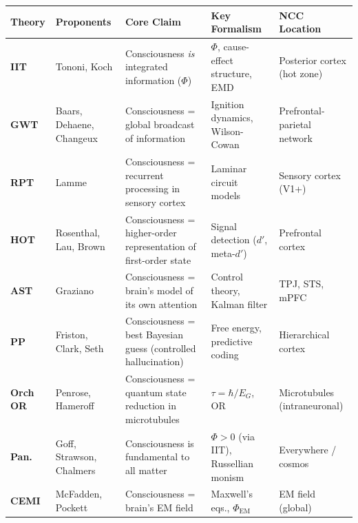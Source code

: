 \documentclass[11pt,a4paper]{report}
\begin{document}
\begin{center}
\renewcommand{\arraystretch}{1.45}
\small
\begin{tabular}{>{\raggedright}p{1.6cm} >{\raggedright}p{2.4cm} >{\raggedright}p{4.2cm} >{\raggedright}p{2.3cm} >{\raggedright\arraybackslash}p{3cm}}
  \toprule
  \textbf{Theory} & \textbf{Proponents} & \textbf{Core Claim} & \textbf{Key Formalism} & \textbf{NCC Location} \\
  \midrule
  \textcolor{iitcol}{\textbf{IIT}} & Tononi, Koch & Consciousness \emph{is} integrated information ($\Phi$) & $\Phi$, cause-effect structure, EMD & Posterior cortex (hot zone) \\[4pt]
  \textcolor{gwtcol}{\textbf{GWT}} & Baars, Dehaene, Changeux & Consciousness = global broadcast of information & Ignition dynamics, Wilson-Cowan & Prefrontal-parietal network \\[4pt]
  \textcolor{rptcol}{\textbf{RPT}} & Lamme & Consciousness = recurrent processing in sensory cortex & Laminar circuit models & Sensory cortex (V1+) \\[4pt]
  \textcolor{hotcol}{\textbf{HOT}} & Rosenthal, Lau, Brown & Consciousness = higher-order representation of first-order state & Signal detection ($d'$, meta-$d'$) & Prefrontal cortex \\[4pt]
  \textcolor{astcol}{\textbf{AST}} & Graziano & Consciousness = brain's model of its own attention & Control theory, Kalman filter & TPJ, STS, mPFC \\[4pt]
  \textcolor{ppcol}{\textbf{PP}} & Friston, Clark, Seth & Consciousness = best Bayesian guess (controlled hallucination) & Free energy, predictive coding & Hierarchical cortex \\[4pt]
  \textcolor{orchcol}{\textbf{Orch OR}} & Penrose, Hameroff & Consciousness = quantum state reduction in microtubules & $\tau = \hbar/E_G$, OR & Microtubules (intraneuronal) \\[4pt]
  \textcolor{pancol}{\textbf{Pan.}} & Goff, Strawson, Chalmers & Consciousness is fundamental to all matter & $\Phi > 0$ (via IIT), Russellian monism & Everywhere / cosmos \\[4pt]
  \textcolor{cemicol}{\textbf{CEMI}} & McFadden, Pockett & Consciousness = brain's EM field & Maxwell's eqs., $\Phi_{\text{EM}}$ & EM field (global) \\
  \bottomrule
\end{tabular}
\end{center}


\end{document}
